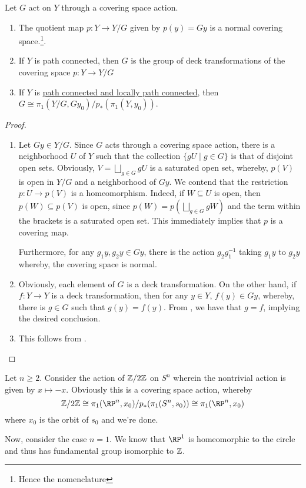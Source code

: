 \begin{theorem}
    Let $G$ act on $Y$ through a covering space action.
    \begin{enumerate}[label=(\alph*)]
        \item The quotient map $p: Y\to Y/G$ given by $p(y) = Gy$ is a normal covering space.\footnote{Hence the nomenclature}.
        \item If $Y$ is path connected, then $G$ is the group of deck transformations of the covering space $p: Y\to Y/G$ 
        \item If $Y$ is \ul{path connected and locally path connected}, then $G\cong\pi_1(Y/G, Gy_0)/p_*(\pi_1(Y, y_0))$.
    \end{enumerate}
\end{theorem}
\begin{proof}
\begin{enumerate}[label=(\alph*)]
    \item Let $Gy\in Y/G$. Since $G$ acts through a covering space action, there is a neighborhood $U$ of $Y$ such that the collection $\{gU\mid g\in G\}$ is that of disjoint open sets. Obviously, $V = \bigsqcup_{g\in G}gU$ is a saturated open set, whereby, $p(V)$ is open in $Y/G$ and a neighborhood of $Gy$. We contend that the restriction $p: U\to p(V)$ is a homeomorphism. Indeed, if $W\subseteq U$ is open, then $p(W)\subseteq p(V)$ is open, since $p(W) = p\left(\bigsqcup_{g\in G}gW\right)$ and the term within the brackets is a saturated open set. This immediately implies that $p$ is a covering map.

    Furthermore, for any $g_1y,g_2y\in Gy$, there is the action $g_2g_1^{-1}$ taking $g_1y$ to $g_2y$ whereby, the covering space is normal.

    \item Obviously, each element of $G$ is a deck transformation. On the other hand, if $f: Y\to Y$ is a deck transformation, then for any $y\in Y$, $f(y)\in Gy$, whereby, there is $g\in G$ such that $g(y) = f(y)$. From , we have that $g=f$, implying the desired conclusion. 
    
    \item This follows from .\qedhere
\end{enumerate}
\end{proof}

\begin{example}
    Let $n\ge 2$. Consider the action of $\mathbb{Z}/2\mathbb{Z}$ on $S^n$ wherein the nontrivial action is given by $x\mapsto -x$. Obviously this is a covering space action, whereby 
    \begin{equation*}
        \Z/2\Z\cong\pi_1(\RP^n, x_0)/p_\ast(\pi_1(S^n, s_0))\cong\pi_1(\RP^n, x_0)
    \end{equation*}
    where $x_0$ is the orbit of $s_0$ and we're done.

    Now, consider the case $n = 1$. We know that $\RP^1$ is homeomorphic to the circle and thus has fundamental group isomorphic to $\mathbb{Z}$.
\end{example}